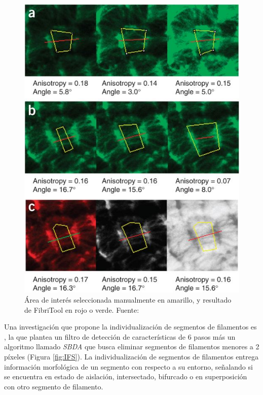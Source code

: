 \begin{figure}[h!]
        \centering
        \includegraphics[scale=0.6]{imagenes/fibritool.jpg}
        \caption{\'Area de inter\'es seleccionada manualmente en amarillo, y resultado de FibriTool en rojo o verde. Fuente: \cite{boudaoud2014fibriltool}}
        \label{fig:fibritool}
\end{figure}

Una investigaci\'on que propone la individualizaci\'on de segmentos de filamentos es \cite{qiu2014quantitative}, la que plantea un filtro de detecci\'on de caracter\'isticas de 6 pasos m\'as un algoritmo llamado \textit{SBDA} que busca eliminar segmentos de filamentos menores a 2 p\'ixeles (Figura \ref{fig:IFS}). La individualizaci\'on de segmentos de filamentos entrega informaci\'on morfol\'ogica de un segmento con respecto a su entorno, se\~nalando si se encuentra en estado de aislaci\'on, intersectado, bifurcado o en superposici\'on con otro segmento de filamento.

